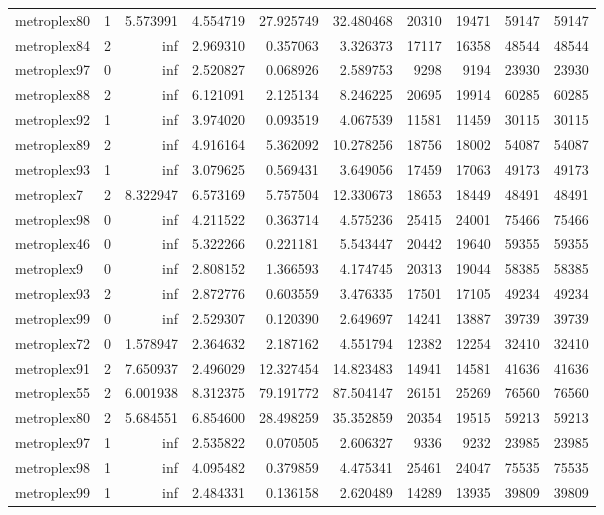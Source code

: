 \begin{longtable}{|l|r|r|r|r|r|r|r|r|r|}
metroplex80 & 1 & 5.573991 & 4.554719 & 27.925749 & 32.480468 & 20310 & 19471 & 59147 & 59147 \\
metroplex84 & 2 & inf & 2.969310 & 0.357063 & 3.326373 & 17117 & 16358 & 48544 & 48544 \\
metroplex97 & 0 & inf & 2.520827 & 0.068926 & 2.589753 & 9298 & 9194 & 23930 & 23930 \\
metroplex88 & 2 & inf & 6.121091 & 2.125134 & 8.246225 & 20695 & 19914 & 60285 & 60285 \\
metroplex92 & 1 & inf & 3.974020 & 0.093519 & 4.067539 & 11581 & 11459 & 30115 & 30115 \\
metroplex89 & 2 & inf & 4.916164 & 5.362092 & 10.278256 & 18756 & 18002 & 54087 & 54087 \\
metroplex93 & 1 & inf & 3.079625 & 0.569431 & 3.649056 & 17459 & 17063 & 49173 & 49173 \\
metroplex7 & 2 & 8.322947 & 6.573169 & 5.757504 & 12.330673 & 18653 & 18449 & 48491 & 48491 \\
metroplex98 & 0 & inf & 4.211522 & 0.363714 & 4.575236 & 25415 & 24001 & 75466 & 75466 \\
metroplex46 & 0 & inf & 5.322266 & 0.221181 & 5.543447 & 20442 & 19640 & 59355 & 59355 \\
metroplex9 & 0 & inf & 2.808152 & 1.366593 & 4.174745 & 20313 & 19044 & 58385 & 58385 \\
metroplex93 & 2 & inf & 2.872776 & 0.603559 & 3.476335 & 17501 & 17105 & 49234 & 49234 \\
metroplex99 & 0 & inf & 2.529307 & 0.120390 & 2.649697 & 14241 & 13887 & 39739 & 39739 \\
metroplex72 & 0 & 1.578947 & 2.364632 & 2.187162 & 4.551794 & 12382 & 12254 & 32410 & 32410 \\
metroplex91 & 2 & 7.650937 & 2.496029 & 12.327454 & 14.823483 & 14941 & 14581 & 41636 & 41636 \\
metroplex55 & 2 & 6.001938 & 8.312375 & 79.191772 & 87.504147 & 26151 & 25269 & 76560 & 76560 \\
metroplex80 & 2 & 5.684551 & 6.854600 & 28.498259 & 35.352859 & 20354 & 19515 & 59213 & 59213 \\
metroplex97 & 1 & inf & 2.535822 & 0.070505 & 2.606327 & 9336 & 9232 & 23985 & 23985 \\
metroplex98 & 1 & inf & 4.095482 & 0.379859 & 4.475341 & 25461 & 24047 & 75535 & 75535 \\
metroplex99 & 1 & inf & 2.484331 & 0.136158 & 2.620489 & 14289 & 13935 & 39809 & 39809 \\

\end{longtable}
